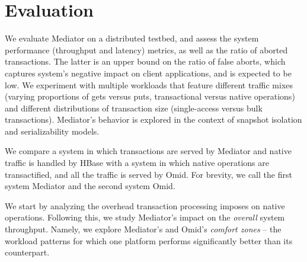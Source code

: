 
\newcommand{\uniform}[1]{\mathcal{U}_{#1}}
\newcommand{\set}[1]{\left\lbrace #1 \right\rbrace}

\section{Evaluation}
\label{sec:eval}

We evaluate Mediator on a distributed testbed, and assess the system 
performance (throughput and latency) metrics, as well as the ratio of 
aborted transactions. The latter is an upper bound on the ratio of false
aborts, which captures system's negative impact on client applications,
and is expected to be low. We experiment with multiple workloads 
that feature different traffic mixes (varying proportions of gets 
versus puts, transactional versus native operations) and different
distributions of transaction size (single-access versus bulk transactions). 
Mediator's behavior is explored in the context of snapshot isolation
and serializability models. 

We compare a system in which transactions are served by Mediator 
and native traffic is handled by HBase with a system in which native
operations are transactified, and all the traffic is served by Omid. For 
brevity, we call the first system Mediator and the second system Omid. 

We start by analyzing the overhead transaction processing imposes 
on native operations. Following this, we study Mediator's impact on the 
{\em overall} system throughput. Namely, we explore Mediator's and Omid's  
{\em comfort zones\/} --  the workload patterns for which one platform 
performs significantly better than its counterpart. 

